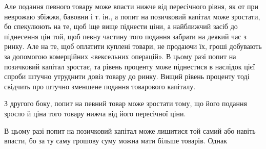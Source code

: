 Але подання певного товару може впасти нижче від пересічного рівня, як
от при неврожаю збіжжя, бавовни і т. ін., а попит на позичковий капітал може
зростати, бо спекулюють на те, щоб іще вище піднести ціни, а найближчий
засіб до піднесення цін той, щоб певну частину того подання забрати на деякий
час з ринку. Але на те, щоб оплатити куплені товари, не продаючи їх,
гроші добувають за допомогою комерційних «вексельних операцій». В цьому
разі попит на позичковий капітал зростає, та рівень проценту може піднестися
в наслідок цієї спроби штучно утруднити довіз товару до ринку. Вищий рівень
проценту тоді свідчить про штучно зменшене подання товарового капіталу.

З другого боку, попит на певний товар може зростати тому, що його подання
зросло й ціна того товару нижча від його пересічної ціни.

В цьому разі попит на позичковий капітал може лишитися той самий або
навіть впасти, бо за ту саму грошову суму можна мати більше товарів. Однак
